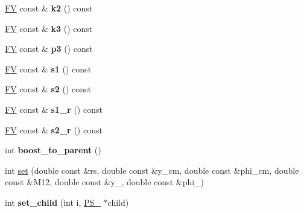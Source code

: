\begin{DoxyCompactItemize}
\item 
\hypertarget{classPS__2__3_a1135303ac75b75469ceee3de6f1d03de}{\hyperlink{classFV}{F\-V} const \& {\bfseries k2} () const }\label{classPS__2__3_a1135303ac75b75469ceee3de6f1d03de}

\item 
\hypertarget{classPS__2__3_a7fab5e0b464b5bd373cfef36df34c8dd}{\hyperlink{classFV}{F\-V} const \& {\bfseries k3} () const }\label{classPS__2__3_a7fab5e0b464b5bd373cfef36df34c8dd}

\item 
\hypertarget{classPS__2__3_a4264525b624f20abba9726190a9bdaec}{\hyperlink{classFV}{F\-V} const \& {\bfseries p3} () const }\label{classPS__2__3_a4264525b624f20abba9726190a9bdaec}

\item 
\hypertarget{classPS__2__3_a8df409a98b15a028d61fd3066773892b}{\hyperlink{classFV}{F\-V} const \& {\bfseries s1} () const }\label{classPS__2__3_a8df409a98b15a028d61fd3066773892b}

\item 
\hypertarget{classPS__2__3_a447e218eba3647afcf3d24dfef90025f}{\hyperlink{classFV}{F\-V} const \& {\bfseries s2} () const }\label{classPS__2__3_a447e218eba3647afcf3d24dfef90025f}

\item 
\hypertarget{classPS__2__3_a4d40c196598e574109dd37179870363a}{\hyperlink{classFV}{F\-V} const \& {\bfseries s1\-\_\-r} () const }\label{classPS__2__3_a4d40c196598e574109dd37179870363a}

\item 
\hypertarget{classPS__2__3_ab5228f4101a880ebc59802364d347a76}{\hyperlink{classFV}{F\-V} const \& {\bfseries s2\-\_\-r} () const }\label{classPS__2__3_ab5228f4101a880ebc59802364d347a76}

\item 
\hypertarget{classPS__2__3_ad6c103ccf419ec6f416c54866d305fd0}{int {\bfseries boost\-\_\-to\-\_\-parent} ()}\label{classPS__2__3_ad6c103ccf419ec6f416c54866d305fd0}

\item 
int \hyperlink{classPS__2__3_a278af8edd62fe80330a5dc5f2d385bf5}{set} (double const \&rs, double const \&y\-\_\-cm, double const \&phi\-\_\-cm, double const \&M12, double const \&y\-\_, double const \&phi\-\_)
\item 
\hypertarget{classPS__2__3_a2da075a0d45b58fd9b4b50f6185a7368}{int {\bfseries set\-\_\-child} (int i, \hyperlink{classPS__2}{P\-S\-\_} $\ast$child)}\label{classPS__2__3_a2da075a0d45b58fd9b4b50f6185a7368}


\end{DoxyCompactItemize}
